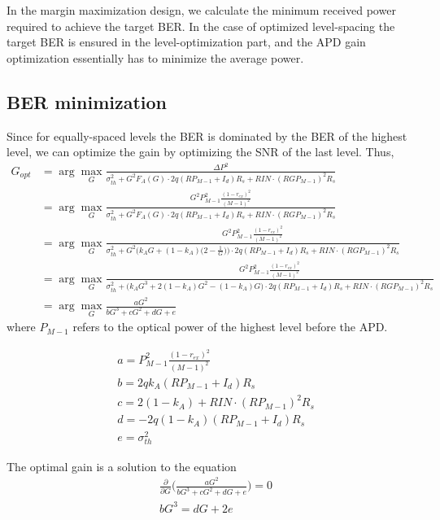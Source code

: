 \documentclass[a4paper]{article}
\begin{document}
In the margin maximization design, we calculate the minimum received power required to achieve the target BER. In the case of optimized level-spacing the target BER is ensured in the level-optimization part, and the APD gain optimization essentially has to minimize the average power.

\subsection{BER minimization}
Since for equally-spaced levels the BER is dominated by the BER of the highest level, we can optimize the gain by optimizing the SNR of the last level. Thus,
\begin{align} \label{eq:Gopt-ber} \nonumber
G_{opt} &= \arg\max_{G} \frac{\Delta P^2}{\sigma_{th}^2 + G^2F_A(G)\cdot 2q(RP_{M-1} + I_d)R_s + RIN\cdot (RGP_{M-1})^2R_s} \\ \nonumber
& = \arg\max_{G}\frac{G^2P^2_{M-1}\frac{(1-r_{ex})^2}{(M-1)^2}}{\sigma_{th}^2 + G^2F_A(G)\cdot 2q(RP_{M-1} + I_d)R_s + RIN\cdot (RGP_{M-1})^2R_s} \\ \nonumber
& = \arg\max_{G}\frac{G^2P^2_{M-1}\frac{(1-r_{ex})^2}{(M-1)^2}}{\sigma_{th}^2 + G^2\Big(k_AG + (1-k_A)\Big(2 - \frac{1}{G}\Big)\Big)\cdot 2q(RP_{M-1} + I_d)R_s + RIN\cdot (RGP_{M-1})^2R_s} \\ \nonumber
& = \arg\max_{G}\frac{G^2P^2_{M-1}\frac{(1-r_{ex})^2}{(M-1)^2}}{\sigma_{th}^2 + \Big(k_AG^3 + 2(1-k_A)G^2 - (1-k_A)G\Big)\cdot 2q(RP_{M-1} + I_d)R_s + RIN\cdot (RGP_{M-1})^2R_s} \\
& = \arg\max_{G}\frac{aG^2}{bG^3 + cG^2 + dG + e}
\end{align}
where $P_{M-1}$ refers to the optical power of the highest level before the APD.

\begin{align}
& a = P^2_{M-1}\frac{(1-r_{ex})^2}{(M-1)^2} \\
& b = 2qk_A(RP_{M-1} + I_d)R_s \\
& c = 2(1-k_A) + RIN\cdot (RP_{M-1})^2R_s \\
& d = -2q(1-k_A)(RP_{M-1} + I_d)R_s \\
& e = \sigma_{th}^2 
\end{align}

The optimal gain is a solution to the equation
\begin{align}
& \frac{\partial}{\partial G}\bigg(\frac{aG^2}{bG^3 + cG^2 + dG + e}\bigg) = 0 \\
& bG^3 = dG + 2e 
\end{align}
\end{document}
